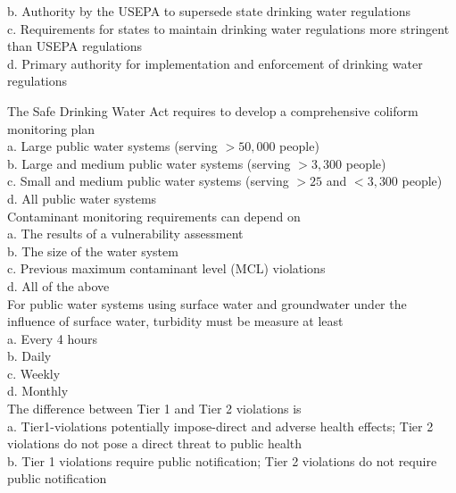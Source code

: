 b. Authority by the USEPA to supersede state drinking water regulations\\

c. Requirements for states to maintain drinking water regulations more stringent than USEPA regulations \\
d. Primary authority for implementation and enforcement of drinking water regulations


The Safe Drinking Water Act requires to develop a comprehensive coliform monitoring plan\\
a. Large public water systems (serving $>50,000$ people)\\
b. Large and medium public water systems (serving $>3,300$ people)\\
c. Small and medium public water systems (serving $>25$ and $<3,300$ people)\\
d. All public water systems\\

Contaminant monitoring requirements can depend on\\

a. The results of a vulnerability assessment\\

b. The size of the water system\\

c. Previous maximum contaminant level (MCL) violations\\

d.  All of the above\\

For public water systems using surface water and groundwater under the influence of surface water, turbidity must be measure at least\\

a. Every 4 hours\\

b. Daily\\

c. Weekly\\

d. Monthly\\

The difference between Tier 1 and Tier 2 violations is\\

a. Tier1-violations potentially impose-direct and adverse health effects; Tier 2 violations do not pose a direct threat to public health\\

b. Tier 1 violations require public notification; Tier 2 violations do not require public notification\\

